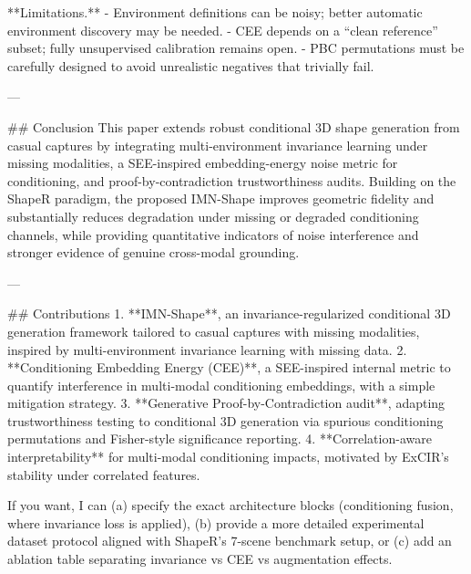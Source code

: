 **Limitations.**  
- Environment definitions can be noisy; better automatic environment discovery may be needed.  
- CEE depends on a “clean reference” subset; fully unsupervised calibration remains open.  
- PBC permutations must be carefully designed to avoid unrealistic negatives that trivially fail.

---

## Conclusion  
This paper extends robust conditional 3D shape generation from casual captures by integrating multi-environment invariance learning under missing modalities, a SEE-inspired embedding-energy noise metric for conditioning, and proof-by-contradiction trustworthiness audits. Building on the ShapeR paradigm, the proposed IMN-Shape improves geometric fidelity and substantially reduces degradation under missing or degraded conditioning channels, while providing quantitative indicators of noise interference and stronger evidence of genuine cross-modal grounding.

---

## Contributions  
1. **IMN-Shape**, an invariance-regularized conditional 3D generation framework tailored to casual captures with missing modalities, inspired by multi-environment invariance learning with missing data.  
2. **Conditioning Embedding Energy (CEE)**, a SEE-inspired internal metric to quantify interference in multi-modal conditioning embeddings, with a simple mitigation strategy.  
3. **Generative Proof-by-Contradiction audit**, adapting trustworthiness testing to conditional 3D generation via spurious conditioning permutations and Fisher-style significance reporting.  
4. **Correlation-aware interpretability** for multi-modal conditioning impacts, motivated by ExCIR’s stability under correlated features.  

If you want, I can (a) specify the exact architecture blocks (conditioning fusion, where invariance loss is applied), (b) provide a more detailed experimental dataset protocol aligned with ShapeR’s 7-scene benchmark setup, or (c) add an ablation table separating invariance vs CEE vs augmentation effects.